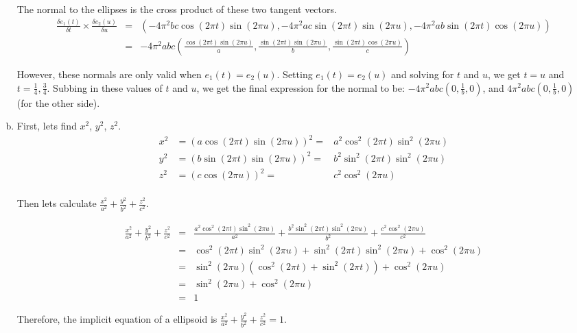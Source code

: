 \documentclass{article} %
\begin{document}
\begin{enumerate}[a)]
The normal to the ellipses is the cross product of these two tangent vectors.
\begin{eqnarray*}
\frac{\delta e_1(t)}{\delta t} \times \frac{\delta e_2(u)}{\delta u} &=& (-4 \pi^2 b c \cos(2 \pi t) \sin (2 \pi u), -4 \pi^2 a c \sin(2 \pi t) \sin (2 \pi u), -4 \pi^2 a b \sin(2 \pi t) \cos (2 \pi u))\\
&=& -4 \pi^2 a b c \left(\frac{\cos(2 \pi t) \sin (2 \pi u)}{a}, \frac{\sin(2 \pi t) \sin (2 \pi u)}{b}, \frac{\sin(2 \pi t) \cos (2 \pi u)}{c}\right)
\end{eqnarray*}

However, these normals are only valid when $e_1(t) = e_2(u)$. Setting $e_1(t) = e_2(u)$ and solving for $t$ and $u$, we get $t=u$ and $t=\frac{1}{4}, \frac{3}{4}$. Subbing in these values of $t$ and $u$, we get the final expression for the normal to be: $-4 \pi^2 a b c (0, \frac{1}{b}, 0)$, and $4 \pi^2 a b c (0, \frac{1}{b}, 0)$ (for the other side). 


\item
First, lets find $x^2$, $y^2$, $z^2$.
\begin{eqnarray*}
x^2 &= (a \cos (2 \pi t) \sin(2 \pi u))^2 =& a^2 \cos^2(2 \pi t) \sin^2 (2 \pi u)\\
y^2 &= (b \sin (2 \pi t) \sin(2 \pi u))^2 =& b^2 \sin^2(2 \pi t) \sin^2 (2 \pi u)\\
z^2 &= (c \cos (2 \pi u))^2 =& c^2 \cos^2(2 \pi u)\\
\end{eqnarray*}

Then lets calculate $\frac{x^2}{a^2} + \frac{y^2}{b^2} + \frac{z^2}{c^2}$.

\begin{eqnarray*}
\frac{x^2}{a^2} + \frac{y^2}{b^2} + \frac{z^2}{c^2} &=& \frac{a^2 \cos^2(2 \pi t) \sin^2 (2 \pi u)}{a^2} +  \frac{b^2 \sin^2(2 \pi t) \sin^2 (2 \pi u)}{b^2} + \frac{c^2 \cos^2(2 \pi u)}{c^2}\\
&=& \cos^2(2 \pi t) \sin^2 (2 \pi u) +  \sin^2(2 \pi t) \sin^2 (2 \pi u) + \cos^2(2 \pi u)\\
&=& \sin^2 (2 \pi u)(\cos^2(2 \pi t) +  \sin^2(2 \pi t))+ \cos^2(2 \pi u)\\
&=& \sin^2 (2 \pi u) + \cos^2(2 \pi u)\\
&=& 1
\end{eqnarray*}

Therefore, the implicit equation of a ellipsoid is $\frac{x^2}{a^2} + \frac{y^2}{b^2} + \frac{z^2}{c^2} = 1$.


\end{enumerate}
\end{document}
